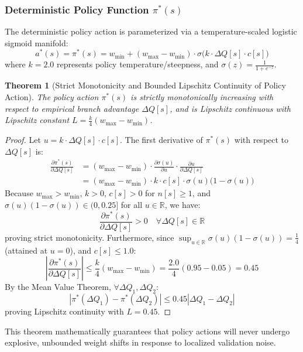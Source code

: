 \documentclass[10pt,journal,compsoc]{IEEEtran}
\newtheorem{theorem}{Theorem}
\begin{document}
\subsubsection{Deterministic Policy Function $\pi^*(s)$}
The deterministic policy action is parameterized via a temperature-scaled logistic sigmoid manifold:
\begin{equation}
a^*(s) = \pi^*(s) = w_{\min} + (w_{\max} - w_{\min}) \cdot \sigma\Big(k \cdot \Delta Q[s] \cdot c[s]\Big)
\end{equation}
where $k = 2.0$ represents policy temperature/steepness, and $\sigma(z) = \frac{1}{1 + e^{-z}}$.

\begin{theorem}[Strict Monotonicity and Bounded Lipschitz Continuity of Policy Action]
The policy action $\pi^*(s)$ is strictly monotonically increasing with respect to empirical branch advantage $\Delta Q[s]$, and is Lipschitz continuous with Lipschitz constant $L = \frac{k}{4}(w_{\max} - w_{\min})$.
\end{theorem}
\begin{proof}
Let $u = k \cdot \Delta Q[s] \cdot c[s]$. The first derivative of $\pi^*(s)$ with respect to $\Delta Q[s]$ is:
\begin{align}
\frac{\partial \pi^*(s)}{\partial \Delta Q[s]} &= (w_{\max} - w_{\min}) \cdot \frac{\partial \sigma(u)}{\partial u} \cdot \frac{\partial u}{\partial \Delta Q[s]} \nonumber \\
&= (w_{\max} - w_{\min}) \cdot k \cdot c[s] \cdot \sigma(u)\big(1 - \sigma(u)\big)
\end{align}
Because $w_{\max} > w_{\min}$, $k > 0$, $c[s] > 0$ for $n[s] \ge 1$, and $\sigma(u)(1 - \sigma(u)) \in (0, 0.25]$ for all $u \in \mathbb{R}$, we have:
\begin{equation}
\frac{\partial \pi^*(s)}{\partial \Delta Q[s]} > 0 \quad \forall \Delta Q[s] \in \mathbb{R}
\end{equation}
proving strict monotonicity. Furthermore, since $\sup_{u \in \mathbb{R}} \sigma(u)(1 - \sigma(u)) = \frac{1}{4}$ (attained at $u = 0$), and $c[s] \le 1.0$:
\begin{equation}
\left| \frac{\partial \pi^*(s)}{\partial \Delta Q[s]} \right| \le \frac{k}{4} (w_{\max} - w_{\min}) = \frac{2.0}{4}(0.95 - 0.05) = 0.45
\end{equation}
By the Mean Value Theorem, $\forall \Delta Q_1, \Delta Q_2$:
\begin{equation}
|\pi^*(\Delta Q_1) - \pi^*(\Delta Q_2)| \le 0.45 |\Delta Q_1 - \Delta Q_2|
\end{equation}
proving Lipschitz continuity with $L = 0.45$.
\end{proof}
This theorem mathematically guarantees that policy actions will never undergo explosive, unbounded weight shifts in response to localized validation noise.
\end{document}
